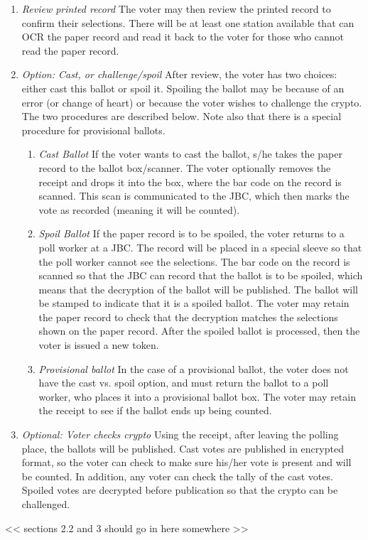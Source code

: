\begin{enumerate}
\item {\em Review printed record}
The voter may then review the printed record to confirm their selections. There will be at least one station available that can OCR the paper record and read it back to the voter for those who cannot read the paper record.

\item {\em Option: Cast, or challenge/spoil}
After review, the voter has two choices: either cast this ballot or spoil it. Spoiling the ballot may be because of an error (or change of heart) or because the voter wishes to challenge the crypto. The two procedures are described below. Note also that there is a special procedure for provisional ballots.

\begin{enumerate}
\item  {\em Cast Ballot}
If the voter wants to cast the ballot, s/he takes the paper record to the ballot box/scanner. The voter optionally removes the receipt and drops it into the box, where the bar code on the record is scanned. This scan is communicated to the JBC, which then marks the vote as recorded (meaning it will be counted).

\item {\em Spoil Ballot}
If the paper record is to be spoiled, the voter returns to a poll worker at a JBC. The record will be placed in a special sleeve so that the poll worker cannot see the selections. The bar code on the record is scanned so that the JBC can record that the ballot is to be spoiled, which means that the decryption of the ballot will be published. The ballot will be stamped to indicate that it is a spoiled ballot. The voter may retain the paper record to check that the decryption matches the selections shown on the paper record. After the spoiled ballot is processed, then the voter is issued a new token.

\item {\em Provisional ballot}
In the case of a provisional ballot, the voter does not have the cast vs. spoil option, and must return the ballot to a poll worker, who places it into a provisional ballot box. The voter may retain the receipt to see if the ballot ends up being counted.
\end{enumerate}

\item {\em Optional: Voter checks crypto}
Using the receipt, after leaving the polling place, the ballots will be published. Cast votes are published in encrypted format, so the voter can check to make sure his/her vote is present and will be counted. In addition, any voter can check the tally of the cast votes. Spoiled votes are decrypted before publication so that the crypto can be challenged.
\end{enumerate}

<< sections 2.2 and 3 should go in here somewhere >>


